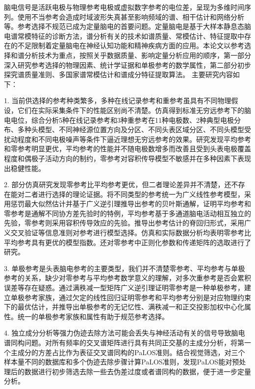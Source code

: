 \begin{chineseabstract}
脑电信号是活跃电极与物理参考电极或虚拟数字参考的电位差，呈现为多维时间序列。使用不当参考会造成时域波形失真甚至影响频域的谱、相干估计和网络分析等。参考选择不规范已成为定量脑电的首要问题。定量脑电是基于大样本静息态脑电谱常模特征的诊断方法，谱分析有关的技术如谱质量、常模估计、特征提取中存在的不足限制着定量脑电在神经认知功能和精神疾病方面的应用。本论文以参考选择和谱分析技术为重点，按照关乎数据质量、影响定量分析应用的顺序，第一部分深入研究参考选择的物理因素、统计学证据和单极参考的数学属性，第二部分初步探究谱质量准则、多国家谱常模估计和谱成分特征提取算法。
主要研究内容如下：

1. 当前供选择的参考种类繁多，多种在线记录参考和重参考虽具有不同物理假设，它们在实际采集条件下的性能区别尚不清楚。仿真得到标准无穷远参考下的脑电电位，综合分析5种在线记录参考和3种重参考在11种电极数、2种典型电极分布、多种头模型、不同神经源位置方向及分区、不同头表区域分区、不同头模型受扰动程度和不同电极噪声等条件下逼近理想无穷远参考的效果。研究发现平均参考和零参考明显更优，平均参考的性能并不随电极数增多而改善且受到头表电极覆盖程度和偶极子活动方向的制约，零参考对容积传导模型不敏感并在多种因素下表现出稳健性能。

2. 部分仿真研究发现零参考比平均参考更优，但二者理论差异并不清楚，还不存在能对二者进行选择的理论证据。将不同类型的参考统一为广义线性参考模型，采用惩罚最大似然估计并基于广义逆引理推导出参考的贝叶斯通解，证明平均参考和零参考是通解不同协方差先验时的特例，平均参考基于多通道脑电活动相互独立的先验，零参考则采用容积传导效应的先验。推导出参考估计的脊回归形式，采用广义交叉验证等信息准则对参考进行模型选择。仿真和实际数据分析均表明零参考比平均参考具有更优的模型指数。还对零参考中正则化参数和传递矩阵的选取进行了研究。

3. 单极参考是头表脑电参考的主要类型，我们并不清楚零参考、平均参考与单极参考的关系，缺少对零参考与平均参考数学意义的理解，对多次重参考是否会累积误差等存在疑惑。通过满秩减一型矩阵广义逆引理证明零参考是一种单极参考，建立单极参考家族，通过欠定的线性回归证明零参考和平均参考分别是对应物理约束下的最优估计，并推导出单极参考的无记忆性、满秩减一和正交投影加权中心化属性。统一的单极参考家族和属性有助于规范参考选择。

4. 独立成分分析等强力伪迹去除方法可能会丢失与神经活动有关的信号导致脑电谱同构问题。对所有频率的交叉谱矩阵进行具有共同正交基的主成分分析，将第一个主成分的方差占比作为表征交叉谱同构的PaLOS准则。结合视觉筛选，对三个样本量不同的数据库和多个伪迹去除步骤计算PaLOS准则，发现PaLOS能对预处理后的数据进行初步筛选去除一些去伪差过度或者谱同构的数据，便于进一步定量分析。


\end{chineseabstract}
